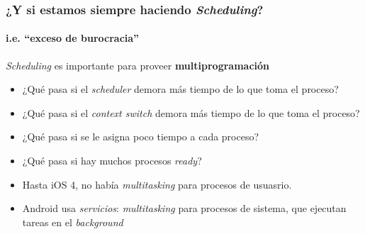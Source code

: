 \documentclass[letter]{beamer}
\begin{document}
\begin{frame}
  \frametitle{¿Y si estamos siempre haciendo {\em Scheduling}?}
  \framesubtitle{i.e. ``exceso de burocracia''}

  {\em Scheduling} es importante para proveer {\bf multiprogramación}
  
  
  \begin{itemize}
    \item<3-> ¿Qué pasa si el {\em scheduler} demora más tiempo de lo que toma el proceso?
    \item<4-> ¿Qué pasa si el {\em context switch} demora más tiempo de lo que toma el proceso?
    \item<5-> ¿Qué pasa si se le asigna poco tiempo a cada proceso?
    \item<6-> ¿Qué pasa si hay muchos procesos {\em ready}?
  \end{itemize}
  
  
  \begin{itemize}
    \item <9->{Hasta iOS 4, no había {\em multitasking} para procesos de usuasrio.}
    \item <10->{Android usa {\em servicios}: {\em multitasking} para procesos de sistema, que ejecutan tareas en el {\em background}}
  \end{itemize}
  
\end{frame}


%
%  
%
%
\end{document}
